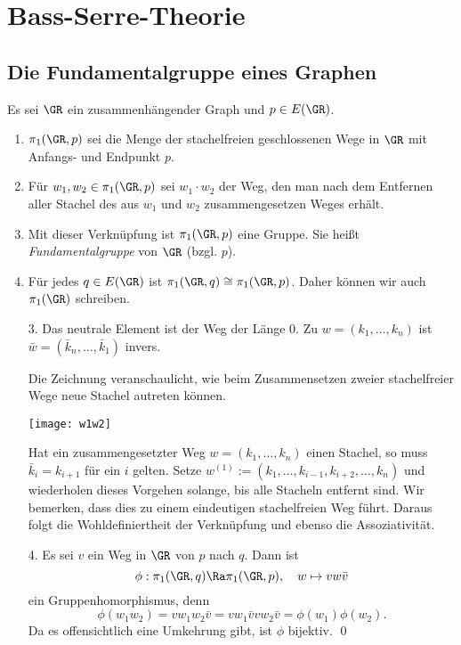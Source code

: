 \chapter{Bass-Serre-Theorie}

\section{Die Fundamentalgruppe eines Graphen}\label{sec_FG}

\DB Es sei $\GR$ ein zusammenhängender Graph und $p\in E(\GR)$.
\begin{enumerate}
\item $\pi_1(\GR,p)$ sei die Menge der stachelfreien geschlossenen
Wege in $\GR$ mit Anfangs- und Endpunkt $p$.
\item Für $w_1, w_2\in \pi_1(\GR,p)$ sei $w_1\cdot w_2$ der
Weg, den man nach dem Entfernen aller Stachel des aus $w_1$ und $w_2$
zusammengesetzen Weges erhält.
\item Mit dieser Verknüpfung ist $\pi_1(\GR,p)$ eine Gruppe.
Sie heißt \emph{Fundamentalgruppe}
von $\GR$ (bzgl. $p$).
\item Für jedes $q\in E(\GR)$ ist $\pi_1(\GR,q)\cong\pi_1(\GR,p)$.
Daher können wir auch $\pi_1(\GR)$ schreiben.
\end{enumerate}
\bew
\begin{itemize}
\item[3.] Das neutrale Element ist der Weg der Länge $0$.
Zu $w=(k_1,\ldots,k_n)$ ist
$\bar{w}=(\bar{k}_n,\ldots,\bar{k}_1)$ invers.

Die Zeichnung veranschaulicht, wie beim Zusammensetzen zweier
stachelfreier Wege neue Stachel autreten können.
\begin{center}
	\texttt{[image: w1w2]}
\end{center}
Hat ein zusammengesetzter Weg $w=(k_1,\ldots,k_n)$ einen Stachel,
so muss $\bar{k}_i=k_{i+1}$ für ein $i$ gelten.
Setze $w^{(1)}:=(k_1,\ldots,k_{i-1},k_{i+2},\ldots,k_n)$ und
wiederholen dieses Vorgehen solange, bis alle Stacheln entfernt sind.
Wir bemerken, dass dies zu einem eindeutigen stachelfreien Weg führt.
Daraus folgt die Wohldefiniertheit der Verknüpfung und ebenso die
Assoziativität.
\item[4.] Es sei $v$ ein Weg in $\GR$ von $p$ nach $q$. Dann ist
\[
\phi:\pi_1(\GR,q)\Ra\pi_1(\GR,p),\quad
w\mapsto vw\bar{v}
\]
ein Gruppenhomorphismus, denn
\[
\phi(w_1 w_2) = v w_1 w_2 \bar{v}
=v w_1 \bar{v} v w_2 \bar{v}
=\phi(w_1)\phi(w_2).
\]
Da es offensichtlich eine Umkehrung gibt, ist $\phi$ bijektiv.
\qed
\end{itemize}

